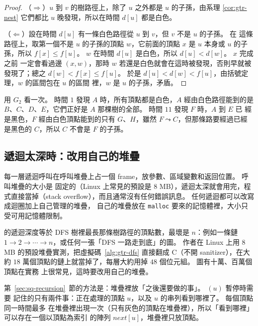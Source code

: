 \begin{proof}
（$\Rightarrow$）$u$ 到 $v$ 的樹路徑上，除了 $u$ 之外都是 $u$ 的子孫，由系理
\ref{cor:gtr-nest} 它們都比 $u$ 晚發現，所以在時間 $d[u]$ 都是白色。

（$\Leftarrow$）設在時間 $d[u]$ 有一條白色路徑從 $u$ 到 $v$，但 $v$ 不是 $u$ 的子孫。 在
這條路徑上，取第一個不是 $u$ 的子孫的頂點 $w$，它前面的頂點 $x$ 是 $u$ 本身或 $u$ 的子
孫，所以 $f[x] \le f[u]$。 $w$ 在時間 $d[u]$ 是白色，所以 $d[u] < d[w]$。 $x$ 完成之前
一定會看過邊 $(x, w)$，那時 $w$ 若還是白色就會在這時被發現，否則早就被發現了；總之
$d[w] < f[x] \le f[u]$。 於是 $d[u] < d[w] < f[u]$，由括號定理，$w$ 的區間包在 $u$ 的區間
裡，$w$ 是 $u$ 的子孫，矛盾。
\end{proof}

用 $G_2$ 看一次。 時間 $1$ 發現 $A$ 時，所有頂點都是白色，$A$ 經由白色路徑能到的是
$B$、$C$、$D$、$E$，它們正好是 $A$ 那棵樹的全部。 時間 $11$ 發現 $F$ 時，$A$ 到 $E$ 已
經是黑色，$F$ 經由白色頂點能到的只有 $G$、$H$，雖然 $F \leadsto C$，但那條路要經過已經
是黑色的 $C$，所以 $C$ 不會是 $F$ 的子孫。

\subsection{遞迴太深時：改用自己的堆疊}
\label{sec:gtr-dfs-iter}

\begin{cbookrecap}[第~15~章 15.4、15.13、15.14 節]
每一層遞迴呼叫在呼叫堆疊上占一個 frame，放參數、區域變數和返回位置。 呼叫堆疊的大小是
固定的（Linux 上常見的預設是 8 MB），遞迴太深就會用完，程式直接當掉（stack
overflow），而且通常沒有任何錯誤訊息。 任何遞迴都可以改寫成迴圈加上自己管理的堆疊，
自己的堆疊放在 \texttt{malloc} 要來的記憶體裡，大小只受可用記憶體限制。
\end{cbookrecap}

 的遞迴深度等於 DFS 樹裡最長那條樹路徑的頂點數，最壞是 $n$：例如一條鏈
$1 \to 2 \to \cdots \to n$，或任何一張「DFS 一路走到底」的圖。 作者在 Linux 上用 8 MB
的預設堆疊實測，把虛擬碼~\ref{alg:gtr-dfs} 直接翻成 C（不開 sanitizer），在大約
$18$ 萬個頂點的鏈上就當掉了，每層大約用掉 $48$ 個位元組。 圖有十萬、百萬個頂點在實務
上很常見，這時要改用自己的堆疊。

第~\ref{sec:sq-recursion}~節的方法是：堆疊裡放「之後還要做的事」。 $(u)$ 暫停時需要
記住的只有兩件事：正在處理的頂點 $u$，以及 $u$ 的串列看到哪裡了。 每個頂點同一時間最多
在堆疊裡出現一次（只有灰色的頂點在堆疊裡），所以「看到哪裡」可以存在一個以頂點為索引
的陣列 $\mathit{next}[u]$，堆疊裡只放頂點。

